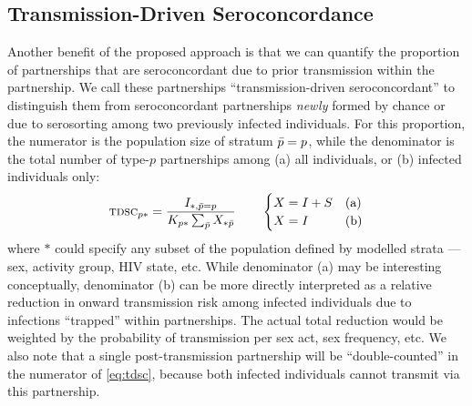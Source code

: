 \subsection{Transmission-Driven Seroconcordance}\label{foi.prop.tdsc}
Another benefit of the proposed approach is that
we can quantify the proportion of partnerships that are seroconcordant
due to prior transmission within the partnership.
We call these partnerships ``transmission-driven seroconcordant''
to distinguish them from seroconcordant partnerships \emph{newly} formed
by chance or due to serosorting \cite{Purcell2017,Kim2020}
among two previously infected individuals.
For this proportion,
the numerator is the population size of stratum $\bar{p}=p$, while
the denominator is the total number of type-$p$ partnerships among
(a) all individuals, or (b) infected individuals only:
\begin{equation}\label{eq:tdsc}
  \textsc{tdsc}_{p*} = \frac{I_{*,\bar{p}=p}}{K_{p*} \sum_{\bar{p}} X_{*\bar{p}}}
  \qquad
  \begin{cases}
    X = I + S & \textnormal{(a)} \\
    X = I     & \textnormal{(b)} \\
  \end{cases}
\end{equation}
where $*$ could specify any subset of the population
defined by modelled strata --- \eg sex, activity group, HIV state, etc.
While denominator (a) may be interesting conceptually,
denominator (b) can be more directly interpreted as
a relative reduction in onward transmission risk among infected individuals
due to infections ``trapped'' within partnerships.
The actual total reduction would be weighted by
the probability of transmission per sex act, sex frequency, etc.
We also note that a single post-transmission partnership
will be ``double-counted'' in the numerator of \eqref{eq:tdsc},
because both infected individuals cannot transmit via this partnership.
